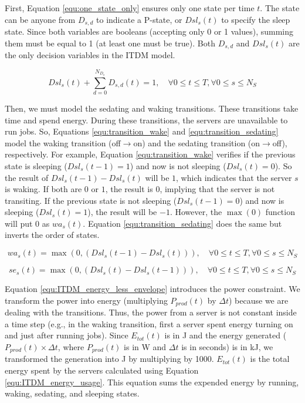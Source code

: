 



First, Equation \ref{equ:one_state_only} ensures only one state per time $t$. The state can be anyone from $D_{s,d}$ to indicate a P-state, or $Dsl_{s}(t)$ to specify the sleep state. Since both variables are booleans (accepting only 0 or 1 values), summing them must be equal to 1 (at least one must be true). Both $D_{s,d}$ and $Dsl_{s}(t)$ are the only decision variables in the ITDM model.

\begin{equation}
    \label{equ:one_state_only}
    Dsl_{s}(t) + \sum_{d=0}^{N_{D_{s}}} D_{s,d}(t) = 1, \quad \forall 0 \le t \le T, \forall 0 \le s \le N_{S}
\end{equation}

Then, we must model the sedating and waking transitions. These transitions take time and spend energy. During these transitions, the servers are unavailable to run jobs. So, Equations \ref{equ:transition_wake} and \ref{equ:transition_sedating} model the waking transition (off$\rightarrow$on) and the sedating transition (on$\rightarrow$off), respectively. For example, Equation \ref{equ:transition_wake} verifies if the previous state is sleeping ($Dsl_{s}(t-1) = 1$) and now is not sleeping ($Dsl_{s}(t) = 0$). So the result of $Dsl_{s}(t-1) - Dsl_{s}(t)$ will be $1$, which indicates that the server $s$ is waking. If both are $0$ or $1$, the result is $0$, implying that the server is not transiting. If the previous state is not sleeping ($Dsl_{s}(t-1) = 0$) and now is sleeping ($Dsl_{s}(t) = 1$), the result will be $-1$. However, the $\max (0)$ function will put 0 as $wa_s(t)$. Equation \ref{equ:transition_sedating} does the same but inverts the order of states.

\begin{equation}
    \label{equ:transition_wake}
    wa_{s}(t) = \max(0, (Dsl_{s}(t-1) - Dsl_{s}(t))), \quad \forall 0 \le t \le T, \forall 0 \le s \le N_{S}
\end{equation}

\begin{equation}
    \label{equ:transition_sedating}
    se_{s}(t) = \max(0, (Dsl_{s}(t) - Dsl_{s}(t-1))), \quad \forall 0 \le t \le T, \forall 0 \le s \le N_{S}
\end{equation}

Equation \ref{equ:ITDM_energy_less_envelope} introduces the power constraint. We transform the power into energy (multiplying $P_{prod}(t)$ by $\Delta t$) because we are dealing with the transitions. Thus, the power from a server is not constant inside a time step (e.g., in the waking transition, first a server spent energy turning on and just after running jobs). Since $E_{tot}(t)$ is in J and the energy generated ($P_{prod}(t) \times \Delta t$, where $P_{prod}(t)$ is in W and $\Delta t$ is in seconds) is in kJ, we transformed the generation into J by multiplying by 1000. $E_{tot}(t)$ is the total energy spent by the servers calculated using Equation \ref{equ:ITDM_energy_usage}. This equation sums the expended energy by running, waking, sedating, and sleeping states.

